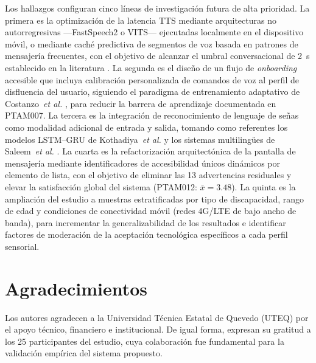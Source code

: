 \documentclass[journal]{IEEEtran}
\begin{document}
		Los hallazgos configuran cinco l\'ineas de investigaci\'on futura de alta prioridad. La primera es la optimizaci\'on de la latencia TTS mediante arquitecturas no autorregresivas ---FastSpeech2 o VITS--- ejecutadas localmente en el dispositivo m\'ovil, o mediante cach\'e predictiva de segmentos de voz basada en patrones de mensajer\'ia frecuentes, con el objetivo de alcanzar el umbral conversacional de 2~s establecido en la literatura \cite{tan2021}. La segunda es el dise\~no de un flujo de \textit{onboarding} accesible que incluya calibraci\'on personalizada de comandos de voz al perfil de disfluencia del usuario, siguiendo el paradigma de entrenamiento adaptativo de Costanzo~\textit{et al.} \cite{costanzo2023}, para reducir la barrera de aprendizaje documentada en PTAM007. La tercera es la integraci\'on de reconocimiento de lenguaje de se\~nas como modalidad adicional de entrada y salida, tomando como referentes los modelos LSTM--GRU de Kothadiya~\textit{et al.} \cite{kothadiya2022} y los sistemas multiling\"ues de Saleem~\textit{et al.} \cite{saleem2023}. La cuarta es la refactorizaci\'on arquitect\'onica de la pantalla de mensajer\'ia mediante identificadores de accesibilidad \'unicos din\'amicos por elemento de lista, con el objetivo de eliminar las 13 advertencias residuales y elevar la satisfacci\'on global del sistema (PTAM012: $\bar{x}=3.48$). La quinta es la ampliaci\'on del estudio a muestras estratificadas por tipo de discapacidad, rango de edad y condiciones de conectividad m\'ovil (redes 4G/LTE de bajo ancho de banda), para incrementar la generalizabilidad de los resultados e identificar factores de moderaci\'on de la aceptaci\'on tecnol\'ogica espec\'ificos a cada perfil sensorial.
		
	
	\section*{Agradecimientos}
	Los autores agradecen a la Universidad T\'ecnica Estatal de Quevedo (UTEQ) por el apoyo t\'ecnico, financiero e institucional. De igual forma, expresan su gratitud a los 25 participantes del estudio, cuya colaboraci\'on fue fundamental para la validaci\'on emp\'irica del sistema propuesto.
	
	
	
\end{document}
